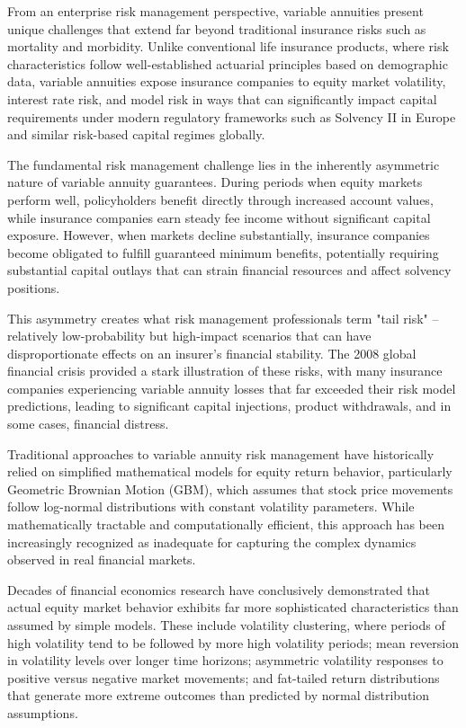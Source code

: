 \documentclass[12pt,a4paper]{report}
\begin{document}
From an enterprise risk management perspective, variable annuities present unique challenges that extend far beyond traditional insurance risks such as mortality and morbidity. Unlike conventional life insurance products, where risk characteristics follow well-established actuarial principles based on demographic data, variable annuities expose insurance companies to equity market volatility, interest rate risk, and model risk in ways that can significantly impact capital requirements under modern regulatory frameworks such as Solvency II in Europe and similar risk-based capital regimes globally.

The fundamental risk management challenge lies in the inherently asymmetric nature of variable annuity guarantees. During periods when equity markets perform well, policyholders benefit directly through increased account values, while insurance companies earn steady fee income without significant capital exposure. However, when markets decline substantially, insurance companies become obligated to fulfill guaranteed minimum benefits, potentially requiring substantial capital outlays that can strain financial resources and affect solvency positions.

This asymmetry creates what risk management professionals term "tail risk" – relatively low-probability but high-impact scenarios that can have disproportionate effects on an insurer's financial stability. The 2008 global financial crisis provided a stark illustration of these risks, with many insurance companies experiencing variable annuity losses that far exceeded their risk model predictions, leading to significant capital injections, product withdrawals, and in some cases, financial distress.

Traditional approaches to variable annuity risk management have historically relied on simplified mathematical models for equity return behavior, particularly Geometric Brownian Motion (GBM), which assumes that stock price movements follow log-normal distributions with constant volatility parameters. While mathematically tractable and computationally efficient, this approach has been increasingly recognized as inadequate for capturing the complex dynamics observed in real financial markets.

Decades of financial economics research have conclusively demonstrated that actual equity market behavior exhibits far more sophisticated characteristics than assumed by simple models. These include volatility clustering, where periods of high volatility tend to be followed by more high volatility periods; mean reversion in volatility levels over longer time horizons; asymmetric volatility responses to positive versus negative market movements; and fat-tailed return distributions that generate more extreme outcomes than predicted by normal distribution assumptions.
\end{document}
